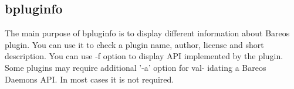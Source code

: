 \subsection{bpluginfo}
\label{bpluginfo}

The main purpose of bpluginfo is to display different information about Bareos plugin. You can
use it to check a plugin name, author, license and short description. You can use -f option  to
display API implemented by the plugin. Some plugins may require additional '-a' option for val-
idating a Bareos Daemons API. In most cases it is not required.
